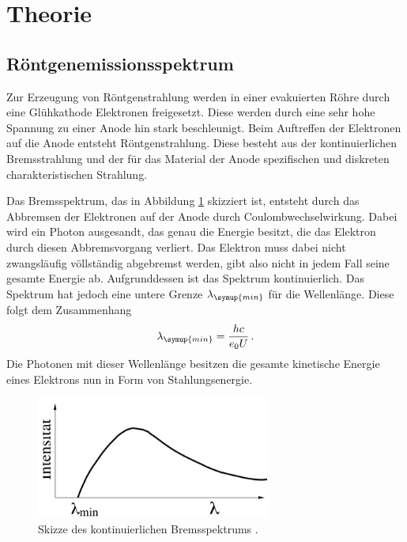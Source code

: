 \section{Theorie}
\label{sec:Theorie}

\subsection{Röntgenemissionsspektrum}
\label{sec:Theorie_emission}

Zur Erzeugung von Röntgenstrahlung werden in einer evakuierten Röhre durch eine
Glühkathode Elektronen freigesetzt. Diese werden durch eine sehr hohe Spannung zu
einer Anode hin stark beschleunigt. Beim Auftreffen der Elektronen auf die Anode
entsteht Röntgenstrahlung. Diese besteht aus der kontinuierlichen Bremsstrahlung
und der für das Material der Anode spezifischen und diskreten charakteristischen
Strahlung.

Das Bremsspektrum, das in Abbildung \ref{fig:bremsspektrum} skizziert ist, entsteht
durch das Abbremsen der Elektronen auf der Anode durch Coulombwechselwirkung. Dabei
wird ein Photon ausgesandt, das genau die Energie besitzt, die das Elektron durch
diesen Abbremsvorgang verliert. Das Elektron muss dabei nicht zwangsläufig völlständig
abgebremst werden, gibt also nicht in jedem Fall seine gesamte Energie ab. Aufgrunddessen
ist das Spektrum kontinuierlich. Das Spektrum hat jedoch eine untere Grenze $\lambda_{\symup{min}}$
für die Wellenlänge. Diese folgt dem Zusammenhang
\begin{equation}
  \lambda_{\symup{min}}=\frac{hc}{e_0 U} \,.
  \label{eqref:lambdamin}
\end{equation}
Die Photonen mit dieser Wellenlänge besitzen die gesamte kinetische Energie eines
Elektrons nun in Form von Stahlungsenergie.

\begin{figure}
  \centering
  \includegraphics[height=4cm]{data/bremsspektrum.png}
  \caption{Skizze des kontinuierlichen Bremsspektrums \cite{Versuchsanleitung}.}
  \label{fig:bremsspektrum}
\end{figure}

